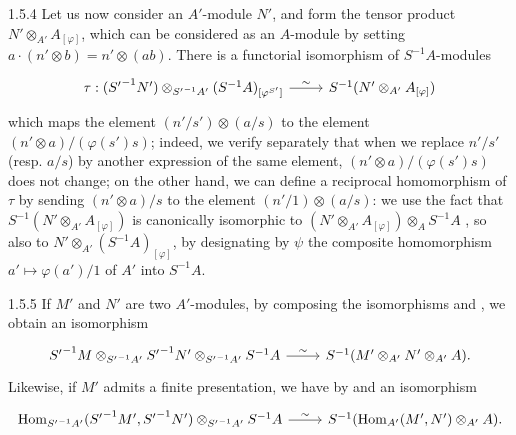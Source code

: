 \documentclass[../main.tex]{subfiles}
\begin{document}
\begin{env}{1.5.4}
Let us now consider an $A'$-module $N'$, and form the tensor product $N'\otimes_{A'}A_{[\varphi]}$,
which can be considered as an $A$-module by setting $a\cdot(n'\otimes b)=n'\otimes(ab)$. There is a
functorial isomorphism of $S^{-1}A$-modules
\[\begin{tikzcd}
  \tau:({S'}^{-1}N')\otimes_{{S'}^{-1}A'}(S^{-1}A)_{[\varphi^{S'}]}\ar[r,"\sim"] &
  S^{-1}(N'\otimes_{A'}A_{[\varphi]})
\end{tikzcd}\]
which maps the element $(n'/s')\otimes(a/s)$ to the element $(n'\otimes a)/(\varphi(s')s)$;
indeed, we verify separately that when we replace $n'/s'$ (resp. $a/s$) by another expression of the
same element, $(n'\otimes a)/(\varphi(s')s)$ does not change; on the other hand, we can define a
reciprocal homomorphism of $\tau$ by sending $(n'\otimes a)/s$ to the element $(n'/1)\otimes(a/s)$:
we use the fact that $S^{-1}(N'\otimes_{A'}A_{[\varphi]})$ is canonically isomorphic to
$(N'\otimes_{A'}A_{[\varphi]})\otimes_A S^{-1}A$ , so also to $N'\otimes_{A'}(S^{-1}A)_{[\varphi]}$,
by designating by $\psi$ the composite homomorphism $a'\mapsto\varphi(a')/1$ of $A'$ into $S^{-1}A$.
\end{env}

\begin{env}{1.5.5}
If $M'$ and $N'$ are two $A'$-modules, by composing the isomorphisms  and , we obtain
an isomorphism
\[\begin{tikzcd}
  {S'}^{-1}M\otimes_{{S'}^{-1}A'}{S'}^{-1}N'\otimes_{{S'}^{-1}A'}S^{-1}A\ar[r,"\sim"] &
  S^{-1}(M'\otimes_{A'}N'\otimes_{A'}A).
\end{tikzcd}\]
Likewise, if $M'$ admits a finite presentation, we have by  and  an isomorphism
\[\begin{tikzcd}
  \Hom_{{S'}^{-1}A'}({S'}^{-1}M',{S'}^{-1}N')\otimes_{{S'}^{-1}A'}S^{-1}A\ar[r,"\sim"] &
  S^{-1}(\Hom_{A'}(M',N')\otimes_{A'}A).
\end{tikzcd}\]
\end{env}
\end{document}

